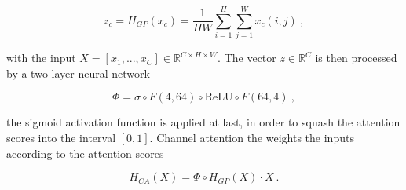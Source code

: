     $$z_c = H_{GP}(x_{c}) = \frac{1}{HW} \sum_{i=1}^H \sum_{j=1}^W x_{c}(i, j) ~, $$

with the input $X = [x_1, ..., x_C] \in \mathbb R^{C \times H \times W}$.
The vector $z \in \mathbb R^{C}$ is then processed by a two-layer neural network

    $$\Phi = \sigma \circ F(4, 64) \circ \text{ReLU} \circ F(64, 4) ~, $$

the sigmoid activation function is applied at last, 
in order to squash the attention scores into the interval $[0, 1]$.
Channel attention the weights the inputs according to the attention scores

    \begin{equation} \label{eq:ca}
        H_{CA}(X) = \Phi \circ H_{GP} (X) \cdot X ~.
    \end{equation}

